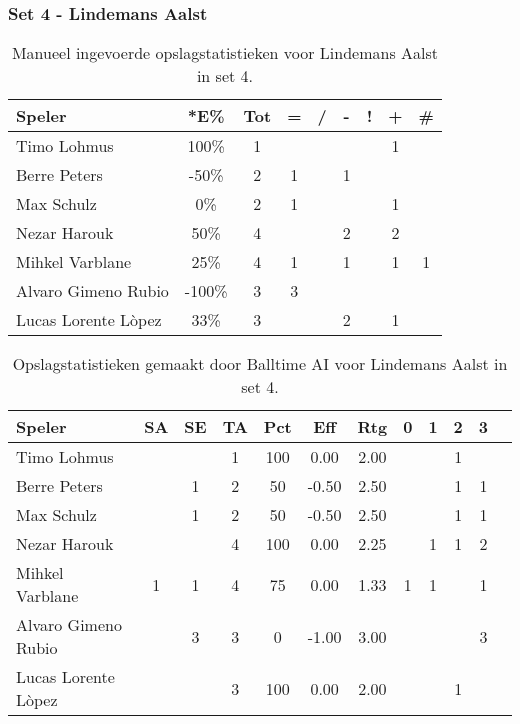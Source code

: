 \subsubsection{Set 4 - Lindemans Aalst}
\label{sec:PL3_Aalst4}


\begin{table}[ht!]
    \centering
    \scriptsize
    \begin{tabular}{|l|c|c|c|c|c|c|c|c|}
        \hline
        \textbf{Speler} & *E\% & Tot & = & / & - & ! & + & \# \\ \hline
        Timo Lohmus & 100\% & 1 &  &  & & & 1 &  \\
        Berre Peters & -50\% & 2 & 1 &  & 1 &  & & \\ 
        Max Schulz & 0\% & 2 & 1 &  &  &  & 1 &\\ 
        Nezar Harouk & 50\% & 4 &  &  & 2 & & 2 &  \\ 
        Mihkel Varblane & 25\% & 4 & 1 &  & 1 &  & 1 & 1\\
        Alvaro Gimeno Rubio & -100\% & 3 & 3 &  &  &  &  & \\ 
        Lucas Lorente Lòpez & 33\% & 3 &  &  & 2 & & 1 &  \\ \hline
    \end{tabular}
    \caption[Manueel ingevoerde opslagstatistieken voor Lindemans Aalst in set 4]{\label{tab:PL3ServeAalstMan4}Manueel ingevoerde opslagstatistieken voor Lindemans Aalst in set 4.}
\end{table}

\begin{table}[ht!]
  \centering
  \scriptsize
  \begin{tabular}{|l|c|c|c|c|c|c|c|c|c|c|c|} \hline
    \textbf{Speler} & SA & SE & TA & Pct & Eff & Rtg & 0 & 1 & 2 & 3  \\ \hline
    Timo Lohmus &  &  & 1 & 100 & 0.00 & 2.00 &   & &  1 &  \\
    Berre Peters &  & 1 & 2 & 50 & -0.50 & 2.50 &   &  & 1 & 1 \\
    Max Schulz &  & 1 & 2 & 50 & -0.50 & 2.50 &   &  & 1 & 1 \\
    Nezar Harouk &  &  & 4 & 100 & 0.00 & 2.25 &   & 1 & 1 & 2 \\
    Mihkel Varblane & 1 & 1 & 4 & 75 & 0.00 & 1.33 & 1 & 1 &   & 1 \\
    Alvaro Gimeno Rubio &  & 3 & 3 & 0 & -1.00 & 3.00 &   &   &  & 3  \\
    Lucas Lorente Lòpez &  &  & 3 & 100 & 0.00 & 2.00 &   &  &  1 &  \\\hline
  \end{tabular}
  \caption[Opslagstatistieken gemaakt door Balltime AI voor Lindemans Aalst in set 4]{\label{tab:PL3ServeAalstAI4}Opslagstatistieken gemaakt door Balltime AI voor Lindemans Aalst in set 4.}
\end{table}

